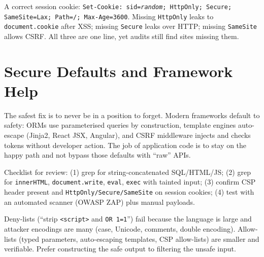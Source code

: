 \begin{example}
A correct session cookie: \texttt{Set-Cookie: sid=\textit{random}; HttpOnly; Secure; SameSite=Lax; Path=/; Max-Age=3600}. Missing \texttt{HttpOnly} leaks to \texttt{document.cookie} after XSS; missing \texttt{Secure} leaks over HTTP; missing \texttt{SameSite} allows CSRF. All three are one line, yet audits still find sites missing them.
\end{example}

\section{Secure Defaults and Framework Help}
\label{sec:defaults}
The safest fix is to never be in a position to forget. Modern frameworks default to safety: ORMs use parameterised queries by construction, template engines auto-escape (Jinja2, React JSX, Angular), and CSRF middleware injects and checks tokens without developer action. The job of application code is to stay on the happy path and not bypass those defaults with ``raw'' APIs.

Checklist for review: (1) grep for string-concatenated SQL/HTML/JS; (2) grep for \texttt{innerHTML}, \texttt{document.write}, \texttt{eval}, \texttt{exec} with tainted input; (3) confirm CSP header present and \texttt{HttpOnly/Secure/SameSite} on session cookies; (4) test with an automated scanner (OWASP ZAP) plus manual payloads.

\begin{remark}
Deny-lists (``strip \texttt{<script>} and \texttt{OR 1=1}'') fail because the language is large and attacker encodings are many (case, Unicode, comments, double encoding). Allow-lists (typed parameters, auto-escaping templates, CSP allow-lists) are smaller and verifiable. Prefer constructing the safe output to filtering the unsafe input.
\end{remark}

